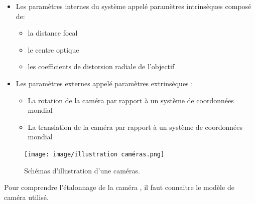   \begin{itemize}
  	\item  Les paramètres internes  du système appelé paramètres intrinsèques composé de:\\
  	
  	\begin{itemize}
  		\item la distance focal
  		\item le centre optique
  		\item les coefficients de distorsion radiale de l'objectif\\
  	\end{itemize}
  	
  	\item Les paramètres externes appelé paramètres extrinsèques :\\
  	
  	\begin{itemize}
  		\item La rotation de la caméra par rapport à un système de coordonnées mondial
  		\item La translation de la caméra par rapport à un système de coordonnées mondial
  	\end{itemize}
  	
  \end{itemize}
 
		\begin{figure}[th]
			\centering
		\texttt{[image: image/illustration caméras.png]}
			\decoRule
			\caption[Illustration d'une caméras]{Schémas d'illustration d'une caméras.}
			\label{fig:Illustration caméras}
		\end{figure}

Pour comprendre l'étalonnage de la caméra , il faut connaitre le modèle de caméra utilisé.

